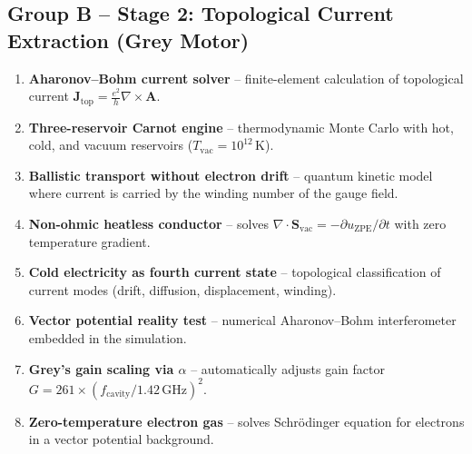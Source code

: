 \documentclass[11pt]{article}
\begin{document}
\subsection{Group B -- Stage 2: Topological Current Extraction (Grey Motor)}
\begin{enumerate}[nosep,start=9]
    \item \textbf{Aharonov--Bohm current solver} -- finite-element calculation of topological current $\mathbf{J}_{\text{top}} = \frac{e^2}{h} \nabla \times \mathbf{A}$.
    \item \textbf{Three-reservoir Carnot engine} -- thermodynamic Monte Carlo with hot, cold, and vacuum reservoirs ($T_{\text{vac}}=10^{12}\,$K).
    \item \textbf{Ballistic transport without electron drift} -- quantum kinetic model where current is carried by the winding number of the gauge field.
    \item \textbf{Non-ohmic heatless conductor} -- solves $\nabla \cdot \mathbf{S}_{\text{vac}} = -\partial u_{\text{ZPE}}/\partial t$ with zero temperature gradient.
    \item \textbf{Cold electricity as fourth current state} -- topological classification of current modes (drift, diffusion, displacement, winding).
    \item \textbf{Vector potential reality test} -- numerical Aharonov--Bohm interferometer embedded in the simulation.
    \item \textbf{Grey's gain scaling via $\alpha$} -- automatically adjusts gain factor $G = 261 \times (f_{\text{cavity}}/1.42\,\text{GHz})^2$.
    \item \textbf{Zero-temperature electron gas} -- solves Schr\"odinger equation for electrons in a vector potential background.
\end{enumerate}
\end{document}
